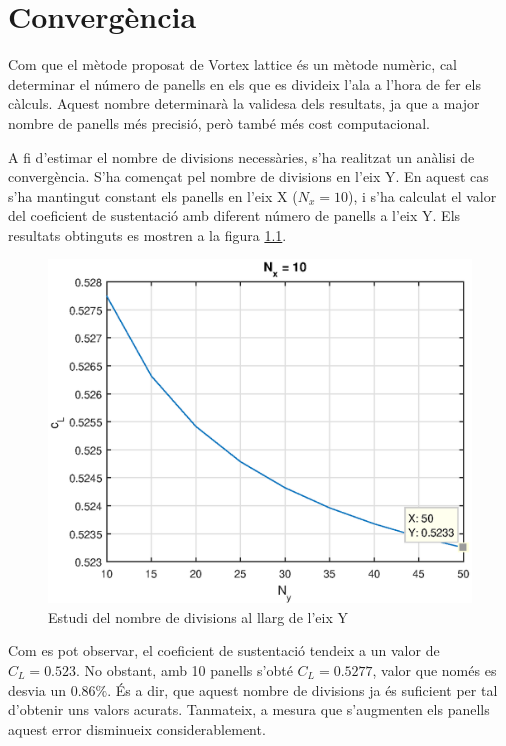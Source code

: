 \chapter{Convergència}
Com que el mètode proposat de Vortex lattice és un mètode numèric, cal determinar el número de panells en els que es divideix l'ala a l'hora de fer els càlculs. Aquest nombre determinarà la validesa dels resultats, ja que a major nombre de panells més precisió, però també més cost computacional.

A fi d'estimar el nombre de divisions necessàries, s'ha realitzat un anàlisi de convergència. S'ha començat pel nombre de divisions en l'eix Y. En aquest cas s'ha mantingut constant els panells en l'eix X ($N_{x}=10$), i s'ha calculat el valor del coeficient de sustentació amb diferent número de panells a l'eix Y. Els resultats obtinguts es mostren a la figura \ref{ny}.

\begin{figure}[h]
	\centering
	\includegraphics{./plots/nycl}
	\caption{Estudi del nombre de divisions al llarg de l'eix Y}
	\label{ny}
\end{figure}

Com es pot observar, el coeficient de sustentació tendeix a un valor de $C_{L}=0.523$. No obstant, amb 10 panells s'obté $C_{L}=0.5277$, valor que només es desvia un $0.86\%$. És a dir, que aquest nombre de divisions ja és suficient per tal d'obtenir uns valors acurats. Tanmateix, a mesura que s'augmenten els panells aquest error disminueix considerablement.

